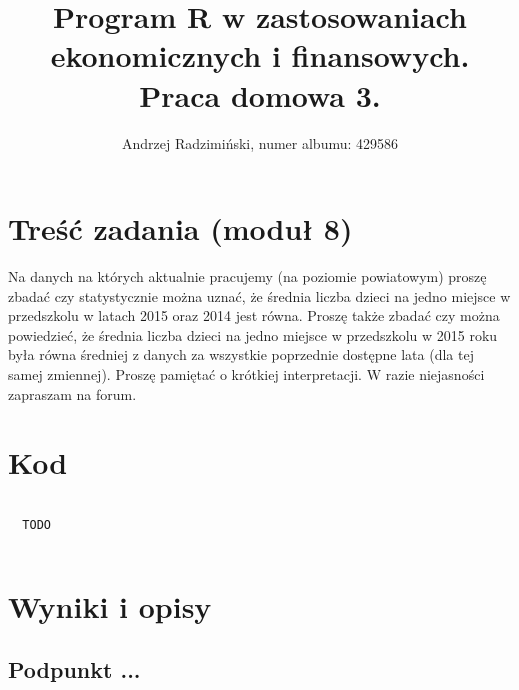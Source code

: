 

\title{Program R w zastosowaniach ekonomicznych i finansowych. Praca domowa 3.}
\author{Andrzej Radzimiński, numer albumu: 429586}
\date{}



\renewcommand{\contentsname}{Spis treści}

\setlength{\parindent}{0pt}
\noindent

\maketitle



\section*{Treść zadania (moduł 8)}

Na danych na których aktualnie pracujemy (na poziomie powiatowym) proszę zbadać czy
statystycznie można uznać, że średnia liczba dzieci na jedno miejsce w przedszkolu w latach
2015 oraz 2014 jest równa. Proszę także zbadać czy można powiedzieć, że średnia liczba
dzieci na jedno miejsce w przedszkolu w 2015 roku była równa średniej z danych za wszystkie
poprzednie dostępne lata (dla tej samej zmiennej). Proszę pamiętać o krótkiej interpretacji. W
razie niejasności zapraszam na forum.

\newpage

\section*{Kod}

\begin{lstlisting}[language=R]

  TODO
  

\end{lstlisting}

\section*{Wyniki i opisy}

\subsection{Podpunkt ...}





